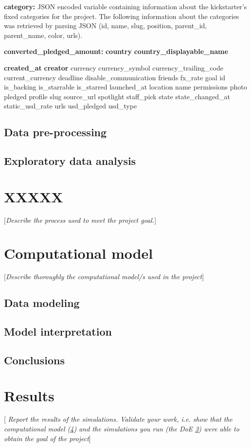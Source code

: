 \documentclass[10pt,english, openany]{book}
\begin{document}
\textbf{category:} JSON encoded variable containing information about the kickstarter's fixed categories for the project. The following information about the categories was retrieved by parsing JSON (id, name, slug, position, parent\_id, parent\_name, color, urls).

\textbf{converted\_pledged\_amount:} 
\textbf{country}
\textbf{country\_displayable\_name}\textbf{}
{\textbf{created\_at}
\textbf{creator}
currency
currency\_symbol
currency\_trailing\_code
current\_currency
deadline
disable\_communication
friends
fx\_rate
goal
id
is\_backing
is\_starrable
is\_starred
launched\_at
location
name
permissions
photo
pledged
profile
slug
source\_url
spotlight
staff\_pick
state
state\_changed\_at
static\_usd\_rate
urls
usd\_pledged
usd\_type

\section{Data pre-processing}

\section{Exploratory data analysis}

\chapter{XXXXX}\label{chapt:doe}
[\textit{Describe the process used to meet the project goal.}]

\chapter{Computational model}\label{chapt:model}
[\textit{Describe thoroughly the computational model/s used in the project}]
\section{Data modeling}
\section{Model interpretation}
\section{Conclusions}

\chapter{Results}\label{chapt:results}
[\textit{ Report the results of the simulations. Validate your work, i.e. show that the computational model (\ref{chapt:model}) and the simulations you run (the DoE \ref{chapt:doe}) were able to obtain the goal of the project}]
}
\end{document}
